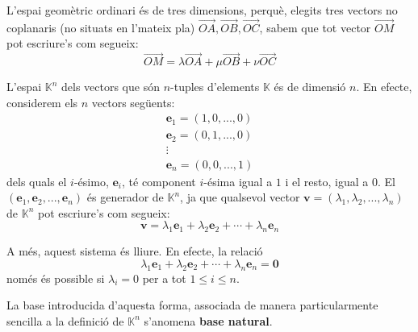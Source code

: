 \begin{exemple}
L'espai geomètric ordinari és de tres dimensions, perquè, elegits
tres vectors no coplanaris (no situats en l’mateix pla) $%
\overrightarrow{OA},\overrightarrow{OB},\overrightarrow{OC}$, sabem que
tot vector $\overrightarrow{OM}$ pot escriure’s com segueix:%
\begin{equation*}
\overrightarrow{OM}=\lambda \overrightarrow{OA}+\mu \overrightarrow{OB}+\nu 
\overrightarrow{OC}
\end{equation*}
\end{exemple}

\begin{exemple}
L'espai $\mathbb{K}^{n}$ dels vectors que són $n$-tuples d’elements $%
\mathbb{K}$ és de dimensió $n$. En efecte, considerem els $n$
vectors següents:%
\begin{equation*}
\begin{array}{c}
\mathbf{e}_{1}=(1,0,...,0) \\ 
\mathbf{e}_{2}=(0,1,...,0) \\ 
\vdots \\ 
\mathbf{e}_{n}=(0,0,...,1)%
\end{array}%
\end{equation*}%
dels quals el $i$-ésimo, $\mathbf{e}_{i}$, té component $i$-ésima igual a $1$ i el resto, igual a $0$. El $(\mathbf{e}_{1},%
\mathbf{e}_{2},...,\mathbf{e}_{n})$ és generador de $\mathbb{K}^{n}$, ja que
qualsevol vector $\mathbf{v}=(\lambda _{1},\lambda _{2},...,\lambda _{n})$
de $\mathbb{K}^{n}$ pot escriure’s com segueix:%
\begin{equation*}
\mathbf{v}=\lambda _{1}\mathbf{e}_{1}+\lambda _{2}\mathbf{e}_{2}+\cdots
+\lambda _{n}\mathbf{e}_{n}
\end{equation*}

A més, aquest sistema és lliure. En efecte, la relació%
\begin{equation*}
\lambda _{1}\mathbf{e}_{1}+\lambda _{2}\mathbf{e}_{2}+\cdots +\lambda _{n}%
\mathbf{e}_{n}=\mathbf{0}
\end{equation*}%
només és possible si $\lambda _{i}=0$ per a tot $1\leq i\leq n$.

La base introducida d’aquesta forma, associada de manera particularmente
sencilla a la definició de $\mathbb{K}^{n}$ s’anomena \textbf{base
natural}.
\end{exemple}

